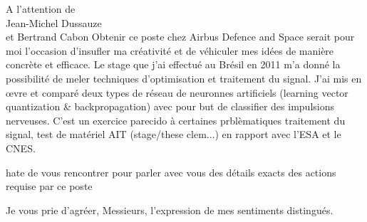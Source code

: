 \documentclass[12pt]{lettre}
\begin{document}
\begin{letter}{A l'attention de\\Jean-Michel Dussauze\\et Bertrand Cabon}
{%
Obtenir ce poste chez Airbus Defence and Space serait pour moi l'occasion
d'insufler ma créativité et de véhiculer mes idées de manière concrète et efficace.
Le stage que j'ai effectué au Brésil en 2011 m'a donné la possibilité de meler
techniques d'optimisation et traitement du signal. J'ai mis en \oe{}vre et comparé
deux types de réseau de neuronnes artificiels (learning vector quantization \&
backpropagation) avec pour but de classifier des impulsions nerveuses.
C'est un exercice parecido à certaines prblèmatiques
traitement du signal, test de matériel AIT (stage/these clem...) en rapport avec
l'ESA et le CNES.
}

hate de vous rencontrer pour parler avec vous des détails exacts des actions
requise par ce poste

\closing{Je vous prie d'agréer, Messieurs, l'expression de mes sentiments distingués.}
\end{letter}
\end{document}
